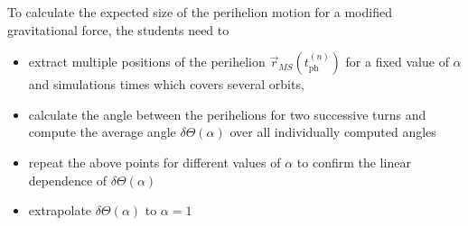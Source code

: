 \documentclass[12pt, UK english]{iopart}
\begin{document}
To calculate the expected size of the perihelion motion for a modified gravitational force, the students need to
\begin{itemize}
\item extract multiple positions of the perihelion $\vec r_{MS} ( t_\mathrm{ph}^{(n)} )$ for a fixed value of $\alpha$ and simulations times which covers several orbits,
\item calculate the angle between the perihelions for two successive turns and compute the average angle $\delta \Theta (\alpha)$ over all individually computed angles
\item repeat the above points for different values of $\alpha$ to confirm the linear dependence of $\delta \Theta (\alpha)$
\item extrapolate $\delta \Theta (\alpha)$ to $\alpha=1$
\end{itemize}
\end{document}
